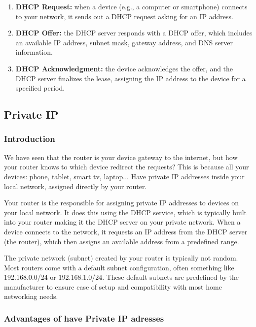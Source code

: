 \documentclass{article}
\begin{document}
\begin{enumerate}
    \item \textbf{DHCP Request:} when a device (e.g., a computer or smartphone) connects to your network, it sends out a DHCP request asking for an IP address.
    \item \textbf{DHCP Offer:} the DHCP server responds with a DHCP offer, which includes an available IP address, subnet mask, gateway address, and DNS server information.
    \item \textbf{DHCP Acknowledgment:} the device acknowledges the offer, and the DHCP server finalizes the lease, assigning the IP address to the device for a specified period.
\end{enumerate}


\subsection{Private IP}

\subsubsection{Introduction}

We have seen that the router is your device gateway to the internet, but how your router knows to which device redirect the requests? This is because all your devices: phone, tablet, smart tv, laptop... Have private IP addresses inside your local network, assigned directly by your router.

Your router is the responsible for assigning private IP addresses to devices on your local network. It does this using the DHCP service, which is typically built into your router making it the DHCP server on your private network. When a device connects to the network, it requests an IP address from the DHCP server (the router), which then assigns an available address from a predefined range.

The private network (subnet) created by your router is typically not random. Most routers come with a default subnet configuration, often something like 192.168.0.0/24 or 192.168.1.0/24. These default subnets are predefined by the manufacturer to ensure ease of setup and compatibility with most home networking needs.

\subsubsection{Advantages of have Private IP adresses}
\end{document}
